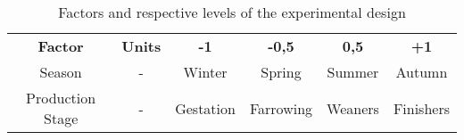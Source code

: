 \begin{table}[]
\centering
\caption{Factors and respective levels of the experimental design}
\label{table4}
\begin{tabular}{cccccc}
\textbf{Factor}  & \textbf{Units} & \textbf{-1} & \textbf{-0,5} & \textbf{0,5} & \textbf{+1} \\
Season           & -              & Winter      & Spring        & Summer       & Autumn      \\
Production Stage & -              & Gestation   & Farrowing     & Weaners      & Finishers  
\end{tabular}
\end{table}